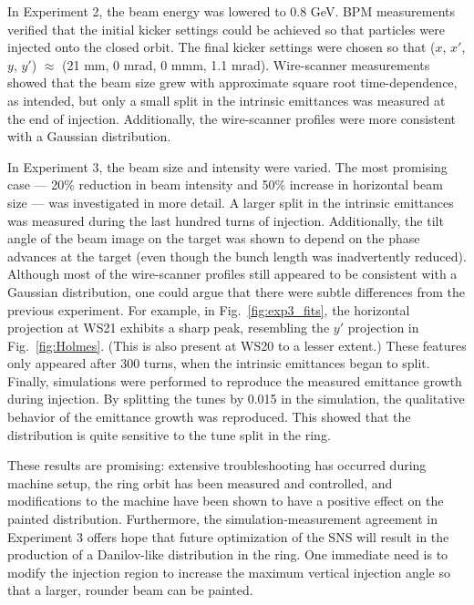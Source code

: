 In Experiment 2, the beam energy was lowered to 0.8 GeV. BPM measurements verified that the initial kicker settings could be achieved so that particles were injected onto the closed orbit. The final kicker settings were chosen so that ($x$, $x'$, $y$, $y'$) $\approx$ (21 mm, 0 mrad, 0 mmm, 1.1 mrad). Wire-scanner measurements showed that the beam size grew with approximate square root time-dependence, as intended, but only a small split in the intrinsic emittances was measured at the end of injection. Additionally, the wire-scanner profiles were more consistent with a Gaussian distribution.

In Experiment 3, the beam size and intensity were varied. The most promising case — 20\% reduction in beam intensity and 50\% increase in horizontal beam size — was investigated in more detail. A larger split in the intrinsic emittances was measured during the last hundred turns of injection. Additionally, the tilt angle of the beam image on the target was shown to depend on the phase advances at the target (even though the bunch length was inadvertently reduced). Although most of the wire-scanner profiles still appeared to be consistent with a Gaussian distribution, one could argue that there were subtle differences from the previous experiment. For example, in Fig.~\ref{fig:exp3_fits}, the horizontal projection at WS21 exhibits a sharp peak, resembling the $y'$ projection in Fig.~\ref{fig:Holmes}. (This is also present at WS20 to a lesser extent.) These features only appeared after 300 turns, when the intrinsic emittances began to split. Finally, simulations were performed to reproduce the measured emittance growth during injection. By splitting the tunes by 0.015 in the simulation, the qualitative behavior of the emittance growth was reproduced. This showed that the distribution is quite sensitive to the tune split in the ring.

These results are promising: extensive troubleshooting has occurred during machine setup, the ring orbit has been measured and controlled, and modifications to the machine have been shown to have a positive effect on the painted distribution. Furthermore, the simulation-measurement agreement in Experiment 3 offers hope that future optimization of the SNS will result in the production of a Danilov-like distribution in the ring. One immediate need is to modify the injection region to increase the maximum vertical injection angle so that a larger, rounder beam can be painted.